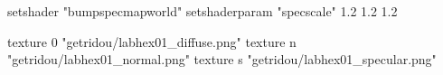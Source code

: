 setshader "bumpspecmapworld"
setshaderparam "specscale" 1.2 1.2 1.2

   texture 0 "getridou/labhex01_diffuse.png"
   texture n "getridou/labhex01_normal.png"
   texture s "getridou/labhex01_specular.png"
